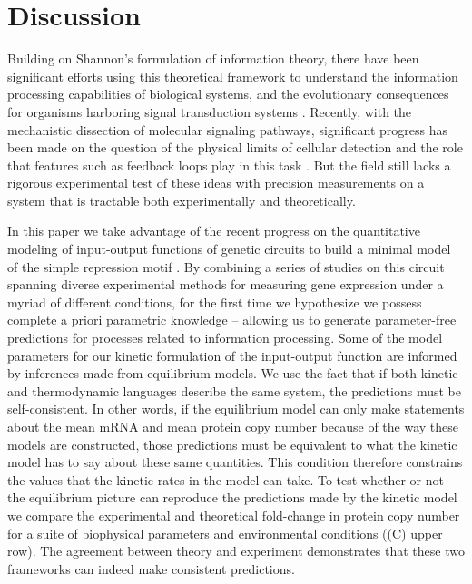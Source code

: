 \section*{Discussion}

Building on Shannon's formulation of information theory, there have been
significant efforts using this theoretical framework to understand the
information processing capabilities of biological systems, and the evolutionary
consequences for organisms harboring signal transduction systems
\cite{Bergstrom2004, Taylor2007, Tkacik2008, Polani2009, Nemenman2010,
Rivoire2011}. Recently, with the mechanistic dissection of molecular signaling
pathways, significant progress has been made on the question of the physical
limits of cellular detection and the role that features such as feedback loops
play in this task \cite{Bialek2005, Libby2007, Tkacik2011, Rhee2012a,
Voliotis2014a}. But the field still lacks a rigorous experimental test of these
ideas with precision measurements on a system that is tractable both
experimentally and theoretically.

In this paper we take advantage of the recent progress on the quantitative
modeling of input-output functions of genetic circuits to build a minimal model
of the simple repression motif \cite{Phillips2019}. By combining a series of
studies on this circuit spanning diverse experimental methods for measuring gene
expression under a myriad of different conditions, for the first time we
hypothesize we possess complete a priori parametric knowledge -- allowing us to
generate parameter-free predictions for processes related to information
processing. Some of the model parameters for our kinetic formulation of the
input-output function are informed by inferences made from equilibrium models.
We use the fact that if both kinetic and thermodynamic languages describe the
same system, the predictions must be self-consistent. In other words, if the
equilibrium model can only make statements about the mean mRNA and mean protein
copy number because of the way these models are constructed, those predictions
must be equivalent to what the kinetic model has to say about these same
quantities. This condition therefore constrains the values that the kinetic
rates in the model can take. To test whether or not the equilibrium picture can
reproduce the predictions made by the kinetic model we compare the experimental
and theoretical fold-change in protein copy number for a suite of biophysical
parameters and environmental conditions ((C) upper row).
The agreement between theory and experiment demonstrates that these two
frameworks can indeed make consistent predictions.

